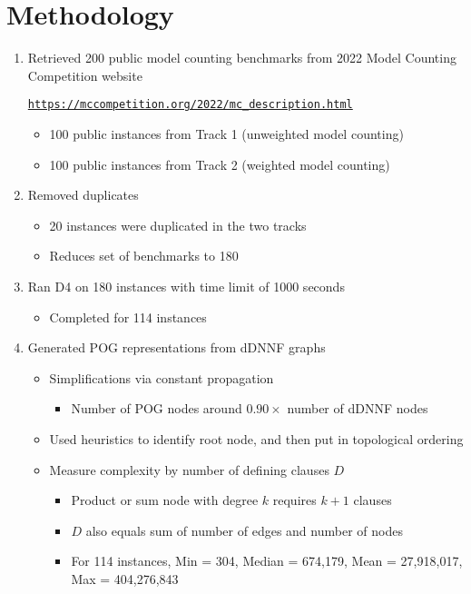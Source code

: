 \documentclass{llncs}
\newcommand{\hcref}[1]{\texttt{\small\url{#1}}}
\begin{document}
\section*{Methodology}
\begin{enumerate}
   \item Retrieved 200 public model counting benchmarks from 2022 Model Counting Competition website
     \begin{center}
       \hcref{https://mccompetition.org/2022/mc\_description.html}
     \end{center}
     \begin{itemize}
     \item 100 public instances from Track 1 (unweighted model counting)
     \item 100 public instances from Track 2 (weighted model counting)
     \end{itemize}
   \item Removed duplicates
     \begin{itemize}
    \item  20 instances were duplicated in the two tracks
     \item Reduces set of benchmarks to 180
     \end{itemize}
   \item Ran D4 on 180 instances with time limit of 1000 seconds
     \begin{itemize}
     \item Completed for 114 instances
     \end{itemize}
   \item Generated POG representations from dDNNF graphs
     \begin{itemize}
     \item Simplifications via constant propagation
       \begin{itemize}
       \item Number of POG nodes around $0{.}90\times$ number of dDNNF nodes
       \end{itemize}
     \item Used heuristics to identify root node, and then put in topological ordering
     \item Measure complexity by number of defining clauses $D$
       \begin{itemize}
       \item Product or sum node with degree $k$ requires $k+1$ clauses
       \item $D$ also equals sum of number of edges and number of nodes
       \item For 114 instances, Min = 304, Median = 674,179, Mean = 27,918,017, Max = 404,276,843

\end{itemize}
\end{itemize}
\end{enumerate}
\end{document}
